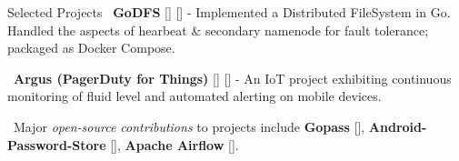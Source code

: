\documentclass{resume}
\begin{document}
    \begin{rSection}{Selected Projects}
    \textbullet\ \textbf{\textsf{GoDFS}} [\textbf{\href{https://rounakdatta.github.io/posts/godfs}{}}] [\textbf{\href{https://github.com/rounakdatta/GoDFS}{}}] -  Implemented a  Distributed FileSystem in Go. Handled the aspects of hearbeat \& secondary namenode for fault tolerance; packaged as Docker Compose.

    \textbullet\ \textbf{\textsf{Argus (PagerDuty for Things)}} [\textbf{\href{https://rounakdatta.github.io/posts/pagerduty-for-iot}{}}] [\textbf{\href{https://github.com/rounakdatta?tab=repositories&q=argus}{}}] - An IoT project exhibiting continuous monitoring of fluid level and automated alerting on mobile devices.

    \textbullet\ Major \emph{open-source contributions} to projects include \textbf{\textsf{Gopass}} [\textbf{\href{https://github.com/gopasspw/gopassbridge}{}}], \textbf{\textsf{Android-Password-Store}} [\textbf{\href{https://github.com/android-password-store/Android-Password-Store}{}}], \textbf{\textsf{Apache Airflow}} [\textbf{\href{https://github.com/apache/airflow}{}}].

  \end{rSection}
\end{document}
